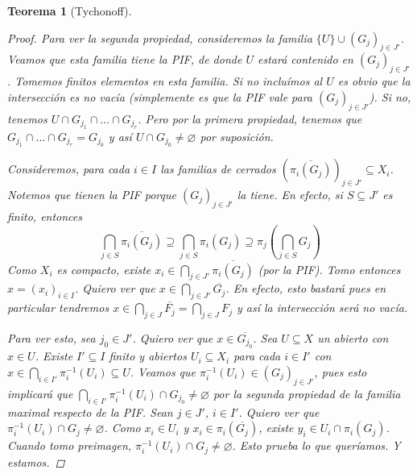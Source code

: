\documentclass[12pt]{book}
\newtheorem{teo}{Teorema}[section]
\theoremstyle{definition}
\let\emptyset\varnothing
\begin{document}
\begin{teo}[Tychonoff]
\begin{proof}
Para ver la segunda propiedad, consideremos la familia $\{U\}\cup (G_j)_{j\in J'}$. Veamos que esta familia tiene la PIF, de donde $U$ estará contenido en $(G_j)_{j\in J'}$. Tomemos finitos elementos en esta familia. Si no incluímos al $U$ es obvio que la intersección es no vacía (simplemente es que la PIF vale para $(G_j)_{j\in J'}$). Si no, tenemos $U\cap G_{j_1}\cap\ldots \cap G_{j_r}$. Pero por la primera propiedad, tenemos que $G_{j_1}\cap\ldots \cap G_{j_r} = G_{j_0}$ y así $U\cap G_{j_0}\neq\emptyset$ por suposición.

Consideremos, para cada $i\in I$ las familias de cerrados $(\overline{\pi_i(G_j)})_{j\in J'}\subseteq X_i$. Notemos que tienen la PIF porque $(G_j)_{j\in J'}$ la tiene. En efecto, si $S\subseteq J'$ es finito, entonces $$\displaystyle\bigcap_{j\in S}\overline{\pi_i(G_j)}\supseteq \displaystyle\bigcap_{j\in S} \pi_i(G_j) \supseteq \pi_j \left(\bigcap_{j\in S}G_j\right)$$ Como $X_i$ es compacto, existe $x_i\in\displaystyle\bigcap_{j\in J'}\overline{\pi_i(G_j)}$ (por la PIF). Tomo entonces $x=(x_i)_{i\in I}$. Quiero ver que $x\in\displaystyle\bigcap_{j\in J'}\overline{G_j}$. En efecto, esto bastará pues en particular tendremos $x\in \displaystyle\bigcap_{j\in J} \overline{F_j} = \displaystyle\bigcap_{j\in J} F_j$ y así la intersección será no vacía.

Para ver esto, sea $j_0\in J'$. Quiero ver que $x\in \overline{G_{j_0}}$. Sea $U\subseteq X$ un abierto con $x\in U$. Existe $I'\subseteq I$ finito y abiertos $U_i\subseteq X_i$ para cada $i\in I'$ con $x\in\displaystyle\bigcap_{i\in I'} \pi_i^{-1}(U_i)\subseteq U$. Veamos que $\pi_i^{-1}(U_i)\in (G_j)_{j\in J'}$, pues esto implicará que $\displaystyle\bigcap_{i\in I'}\pi_i^{-1}(U_i)\cap G_{j_0}\neq\emptyset$ por la segunda propiedad de la familia maximal respecto de la PIF. Sean $j\in J'$, $i\in I'$. Quiero ver que $\pi_i^{-1}(U_i)\cap G_j\neq\emptyset$. Como $x_i\in U_i$ y $x_i\in \pi_{i}(\overline{G_j})$, existe $y_i\in U_i\cap \pi_i(G_j)$. Cuando tomo preimagen, $\pi_i^{-1}(U_i)\cap G_j\neq\emptyset$. Esto prueba lo que queríamos. Y estamos.

\end{proof}
\end{teo}
\end{document}
